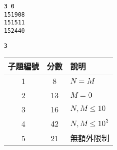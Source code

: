 \begin{multicols}{2}
\begin{lstlisting}
3 0
151908
151511
152440
\end{lstlisting}
\columnbreak
{}
\begin{lstlisting}
3
\end{lstlisting}
\end{multicols}


\begin{table}[h]
    \centering
    \begin{tabularx}{0.8\textwidth}{ccX}
        子題編號 & 分數 & 說明 \\ \hline
        1 & 8 & $N=M$ \\
        2 & 13 & $M=0$ \\
        3 & 16 & $N,M \leq 10$\\
        4 & 42 & $N,M \leq 10^3$\\
        5 & 21 & 無額外限制
    \end{tabularx}
\end{table}
